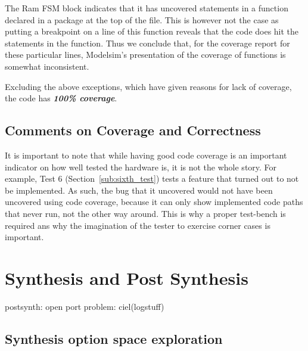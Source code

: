 \documentclass[]{article}
\begin{document}
The Ram FSM block indicates that it has uncovered statements in a function declared in a package at the top of the file. This is however not the case as putting a breakpoint on a line of this function reveals that the code does hit the statements in the function. Thus we conclude that, for the coverage report for these particular lines, Modelsim's presentation of the coverage of functions is somewhat inconsistent.

Excluding the above exceptions, which have given reasons for lack of coverage, the code has \emph{\textbf{100\% coverage}}.

\subsection{Comments on Coverage and Correctness} %
\label{sub:comments_on_coverage_and_correctness}

It is important to note that while having good code coverage is an important indicator on how well tested the hardware is, it is not the whole story. For example, Test 6 (Section~\ref{sub:sixth_test}) tests a feature that turned out to not be implemented.
As such, the bug that it uncovered would not have been uncovered using code coverage, because it can only show implemented code paths that never run, not the other way around. This is why a proper test-bench is required ans why the imagination of the tester to exercise corner cases is important.



\section{Synthesis and Post Synthesis} %
\label{sec:synthesis_and_post_synthesis}

postsynth: open port problem: ciel(logstuff)

\subsection{Synthesis option space exploration} %
\end{document}
